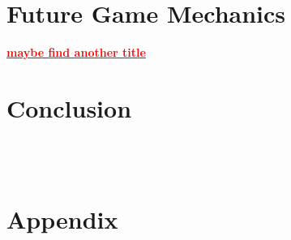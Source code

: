 \documentclass[preprint,12pt, authoryear]{elsarticle}
\newcommand\commenting[1]{\textcolor{red}{\textbf{\underline{#1}}}}
\begin{document}
\section{Future Game Mechanics}
\commenting{maybe find another title}
\label{Future}




\section{Conclusion}








\section*{\refname}



\








\appendix

\section{Appendix}
\label{appendix}
\end{document}
